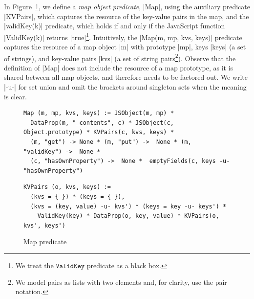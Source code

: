 In Figure~\ref{fig:map:example}, we define a \emph{map object predicate}, \jsinline|Map|, 
using the auxiliary predicate \jsinline|KVPairs|, which captures the resource of the key-value pairs in the map, 
and the \jsinline|validKey(k)| predicate, which holds if and only if the 
JavaScript function \jsinline|ValidKey(k)| returns \jsinline|true|\footnote{We treat the $\mathtt{ValidKey}$ predicate as a black box.}.
%
Intuitively, the \jsinline|Map(m, mp, kvs, keys)| predicate captures the resource 
of a map object \jsinline|m| with prototype \jsinline|mp|, keys \jsinline|keys| (a set of strings),
and key-value pairs \jsinline|kvs| (a set of string pairs\footnote{We model pairs as lists with two elements and, for clarity, use the pair notation.}). 
Observe that the definition of \jsinline|Map| does not include the resource of a map prototype, as
it is shared between all map objects, and therefore needs to be factored out.  
%
We write \jsinline|-u-| for set union and omit the brackets around singleton 
sets when the meaning is clear. %

\begin{figure}[t!]
{\scriptsize
 \begin{verbatim}
Map (m, mp, kvs, keys) := JSObject(m, mp) * 
  DataProp(m, "_contents", c) * JSObject(c, Object.prototype) * KVPairs(c, kvs, keys) *
  (m, "get") -> None * (m, "put") ->  None * (m, "validKey") ->  None * 
  (c, "hasOwnProperty") ->  None *  emptyFields(c, keys -u- "hasOwnProperty")
  \end{verbatim}
  \vspace*{-0.3cm}
 \begin{verbatim}
KVPairs (o, kvs, keys) := 
  (kvs = { }) * (keys = { }),
  (kvs = (key, value) -u- kvs') * (keys = key -u- keys') * 
    ValidKey(key) * DataProp(o, key, value) * KVPairs(o, kvs', keys')
\end{verbatim}}
\caption{Map predicate \label{fig:map:example}}
\end{figure}



